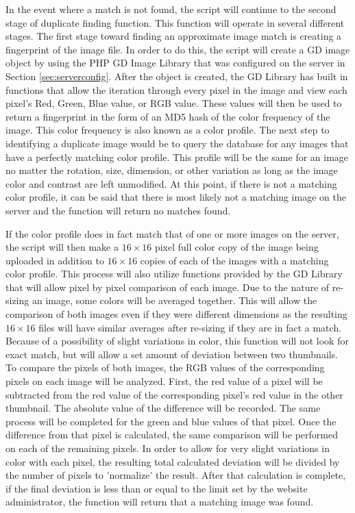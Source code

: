 In the event where a match is not found, the script will continue to the second stage of duplicate finding function. This function will operate in several different stages. The first stage toward finding an approximate image match is creating a fingerprint of the image file. In order to do this, the script will create a GD image object by using the PHP GD Image Library that was configured on the server in Section \ref{sec:serverconfig}. After the object is created, the GD Library has built in functions that allow the iteration through every pixel in the image and view each pixel's Red, Green, Blue value, or RGB value. These values will then be used to return a fingerprint in the form of an MD5 hash of the color frequency of the image. This color frequency is also known as a color profile. The next step to identifying a duplicate image would be to query the database for any images that have a perfectly matching color profile. This profile will be the same for an image no matter the rotation, size, dimension, or other variation as long as the image color and contrast are left unmodified. At this point, if there is not a matching color profile, it can be said that there is most likely not a matching image on the server and
the function will return no matches found.

If the color profile does in fact match that of one or more images on the server, the script will then make a $16\times16$ pixel full color copy of the image being uploaded in addition to $16\times16$ copies of each of the images with a matching color profile. This process will also utilize functions provided by the GD Library that will allow pixel by pixel comparison of each image. Due to the nature of re-sizing an image, some colors will be averaged together. This will allow the comparison of both images even if they were different dimensions as the resulting $16\times16$ files will have similar averages after re-sizing if they are in fact a match. Because of a possibility of slight variations in color, this function will not look for exact match, but will allow a set amount of deviation between two thumbnails. To compare the pixels of both images, the RGB values of the corresponding pixels on each image will be analyzed. First, the red value of a pixel will be subtracted from the red value of the corresponding pixel's red value in the other thumbnail. The absolute value of the difference will be recorded. The same process will be completed for the green and blue values of that pixel. Once the difference from that pixel is calculated, the same comparison will be performed on each of the remaining pixels. In order to allow for very slight variations in color with each pixel, the resulting total calculated deviation will be divided by the number of pixels to 'normalize' the result. After that calculation is complete, if the final deviation is less than or equal to the limit set by the website administrator, the function will return that a matching image was found.


